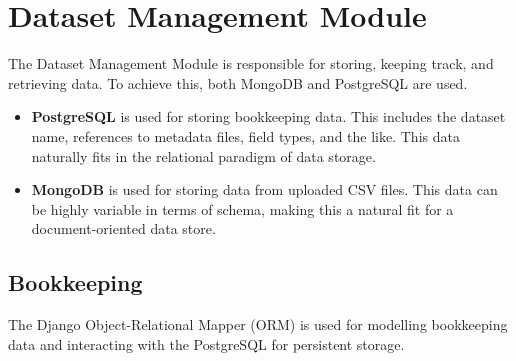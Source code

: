 
\section{Dataset Management Module}

The Dataset Management Module is responsible for storing, keeping track, and retrieving data. To achieve this, both MongoDB and PostgreSQL are used.

\begin{itemize}
\item \textbf{PostgreSQL} is used for storing bookkeeping data. This includes the dataset name, references to metadata files, field types, and the like. This data naturally fits in the relational paradigm of data storage.
\item \textbf{MongoDB} is used for storing data from uploaded CSV files. This data can be highly variable in terms of schema, making this a natural fit for a document-oriented data store.
\end{itemize}


\subsection{Bookkeeping}

The Django Object-Relational Mapper (ORM) is used for modelling bookkeeping data and interacting with the PostgreSQL for persistent storage.

\clearpage